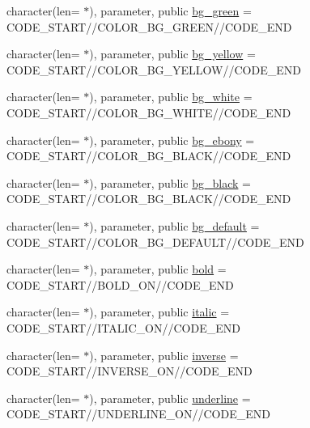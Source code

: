\begin{DoxyCompactItemize}
\item 
character(len= $\ast$), parameter, public \mbox{\hyperlink{namespacem__escape_a5754e4af92f738d3fd7c95daeaa7f2e1}{bg\+\_\+green}} = C\+O\+D\+E\+\_\+\+S\+T\+A\+RT//C\+O\+L\+O\+R\+\_\+\+B\+G\+\_\+\+G\+R\+E\+EN//C\+O\+D\+E\+\_\+\+E\+ND
\item 
character(len= $\ast$), parameter, public \mbox{\hyperlink{namespacem__escape_afe23b71a7646ac88c8c74358994f92d0}{bg\+\_\+yellow}} = C\+O\+D\+E\+\_\+\+S\+T\+A\+RT//C\+O\+L\+O\+R\+\_\+\+B\+G\+\_\+\+Y\+E\+L\+L\+OW//C\+O\+D\+E\+\_\+\+E\+ND
\item 
character(len= $\ast$), parameter, public \mbox{\hyperlink{namespacem__escape_a87dfd88e3190a8717cc574d4f2a4445c}{bg\+\_\+white}} = C\+O\+D\+E\+\_\+\+S\+T\+A\+RT//C\+O\+L\+O\+R\+\_\+\+B\+G\+\_\+\+W\+H\+I\+TE//C\+O\+D\+E\+\_\+\+E\+ND
\item 
character(len= $\ast$), parameter, public \mbox{\hyperlink{namespacem__escape_ab3691cc02cfaf12d6f7e18fac8a70b0b}{bg\+\_\+ebony}} = C\+O\+D\+E\+\_\+\+S\+T\+A\+RT//C\+O\+L\+O\+R\+\_\+\+B\+G\+\_\+\+B\+L\+A\+CK//C\+O\+D\+E\+\_\+\+E\+ND
\item 
character(len= $\ast$), parameter, public \mbox{\hyperlink{namespacem__escape_a2f34e53ba01ebac10ab70f25e3c9727a}{bg\+\_\+black}} = C\+O\+D\+E\+\_\+\+S\+T\+A\+RT//C\+O\+L\+O\+R\+\_\+\+B\+G\+\_\+\+B\+L\+A\+CK//C\+O\+D\+E\+\_\+\+E\+ND
\item 
character(len= $\ast$), parameter, public \mbox{\hyperlink{namespacem__escape_a329b88dbfe4ad42f896cdf408dcd9784}{bg\+\_\+default}} = C\+O\+D\+E\+\_\+\+S\+T\+A\+RT//C\+O\+L\+O\+R\+\_\+\+B\+G\+\_\+\+D\+E\+F\+A\+U\+LT//C\+O\+D\+E\+\_\+\+E\+ND
\item 
character(len= $\ast$), parameter, public \mbox{\hyperlink{namespacem__escape_a9a369de1d051ce7fdbdedcba4574c962}{bold}} = C\+O\+D\+E\+\_\+\+S\+T\+A\+RT//B\+O\+L\+D\+\_\+\+ON//C\+O\+D\+E\+\_\+\+E\+ND
\item 
character(len= $\ast$), parameter, public \mbox{\hyperlink{namespacem__escape_afbb060c43fe019ca7fc699073cf30399}{italic}} = C\+O\+D\+E\+\_\+\+S\+T\+A\+RT//I\+T\+A\+L\+I\+C\+\_\+\+ON//C\+O\+D\+E\+\_\+\+E\+ND
\item 
character(len= $\ast$), parameter, public \mbox{\hyperlink{namespacem__escape_a568054a95202a9290fc4f314ff7c9012}{inverse}} = C\+O\+D\+E\+\_\+\+S\+T\+A\+RT//I\+N\+V\+E\+R\+S\+E\+\_\+\+ON//C\+O\+D\+E\+\_\+\+E\+ND
\item 
character(len= $\ast$), parameter, public \mbox{\hyperlink{namespacem__escape_acee3a3082a12ed884ef99019d0f30f86}{underline}} = C\+O\+D\+E\+\_\+\+S\+T\+A\+RT//U\+N\+D\+E\+R\+L\+I\+N\+E\+\_\+\+ON//C\+O\+D\+E\+\_\+\+E\+ND

\end{DoxyCompactItemize}
